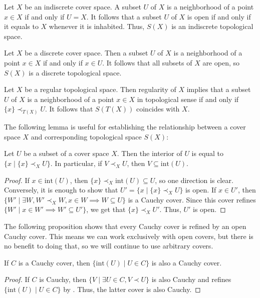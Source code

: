 \documentclass[reqno]{amsart}
\theoremstyle{definition}
\theoremstyle{remark}
\numberwithin{figure}{section}
\newcommand{\rb}{\prec}
\begin{document}
\begin{example}
Let $X$ be an indiscrete cover space.
A subset $U$ of $X$ is a neighborhood of a point $x \in X$ if and only if $U = X$.
It follows that a subset $U$ of $X$ is open if and only if it equals to $X$ whenever it is inhabited.
Thus, $S(X)$ is an indiscrete topological space.
\end{example}

\begin{example}
Let $X$ be a discrete cover space.
Then a subset $U$ of $X$ is a neighborhood of a point $x \in X$ if and only if $x \in U$.
It follows that all subsets of $X$ are open, so $S(X)$ is a discrete topological space.
\end{example}

\begin{example}
Let $X$ be a regular topological space.
Then regularity of $X$ implies that a subset $U$ of $X$ is a neighborhood of a point $x \in X$ in topological sense if and only if $\{ x \} \rb_{T(X)} U$.
It follows that $S(T(X))$ coincides with $X$.
\end{example}

The following lemma is useful for establishing the relationship between a cover space $X$ and corresponding topological space $S(X)$:

\begin{lem}
Let $U$ be a subset of a cover space $X$.
Then the interior of $U$ is equal to $\{ x \mid \{ x \} \rb_X U \}$.
In particular, if $V \rb_X U$, then $V \subseteq \mathrm{int}(U)$.
\end{lem}
\begin{proof}
If $x \in \mathrm{int}(U)$, then $\{ x \} \rb_X \mathrm{int}(U) \subseteq U$, so one direction is clear.
Conversely, it is enough to show that $U' = \{ x \mid \{ x \} \rb_X U \}$ is open.
If $x \in U'$, then $\{ W' \mid \exists W, W' \rb_X W, x \in W \implies W \subseteq U \}$ is a Cauchy cover.
Since this cover refines $\{ W' \mid x \in W' \implies W' \subseteq U' \}$, we get that $\{ x \} \rb_X U'$.
Thus, $U'$ is open.
\end{proof}

The following proposition shows that every Cauchy cover is refined by an open Cauchy cover.
This means we can work exclusively with open covers, but there is no benefit to doing that, so we will continue to use arbitrary covers.

\begin{prop}
If $C$ is a Cauchy cover, then $\{ \mathrm{int}(U) \mid U \in C \}$ is also a Cauchy cover.
\end{prop}
\begin{proof}
If $C$ is Cauchy, then $\{ V \mid \exists U \in C, V \rb U \}$ is also Cauchy and refines $\{ \mathrm{int}(U) \mid U \in C\}$ by .
Thus, the latter cover is also Cauchy.
\end{proof}
\end{document}
